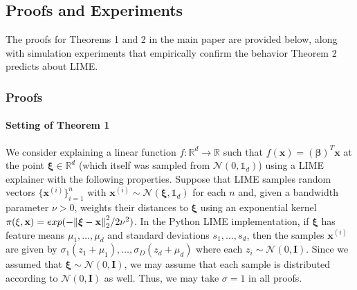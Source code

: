 \documentclass[mnsc,blindrev]{informs3}
\begin{document}
   

    
    
    \subsection{Proofs and Experiments}  
        \label{apx_sec:proofs}    
        The proofs for Theorems 1 and 2 in the main paper are provided below, along with simulation experiments that empirically confirm the behavior Theorem 2 predicts about LIME. 
        
        \subsubsection{Proofs}
        \paragraph{Setting of Theorem 1}
            We consider explaining a linear function $f:\mathbb{R}^d \rightarrow \mathbb{R}$ such that $f(\mathbf{x}) = (\boldsymbol{\beta})^T \mathbf{x}$ at the point $\boldsymbol{\xi}\in \mathbb{R}^d$ (which itself was sampled from $\mathcal{N}(0, \mathds{1}_d)$) using a LIME explainer with the following properties. Suppose that LIME samples random vectors $\{\mathbf{x}^{(i)}\}_{i=1}^n$ with $\mathbf{x}^{(i)} \sim \mathcal{N}(\boldsymbol{\xi},\mathds{1}_d)$ for each $n$ and, given a bandwidth parameter $\nu > 0$, weights their distances to $\boldsymbol{\xi}$ using an exponential kernel $\pi(\xi,\mathbf{x}) = exp(-\norm{\boldsymbol{\xi} - \mathbf{x}}_2^2/2\nu^2)$. In the Python LIME implementation, if $\boldsymbol{\xi}$ has feature means $\mu_1,\ldots,\mu_d$ and standard deviations $s_1,\ldots,s_d$, then the samples $\mathbf{x}^{(i)}$ are given by $\sigma_1(z_1 + \mu_1),\ldots,\sigma_D(z_d + \mu_d)$ where each $z_i\sim \mathcal{N}(0,\mathbf{I})$. Since we assumed that $\boldsymbol{\xi} \sim \mathcal{N}(0,\mathbf{I})$, we may assume that each sample is distributed according to $\mathcal{N}(0,\mathbf{I})$ as well. Thus, we may take $\sigma = 1$ in all proofs. 
        
\end{document}
